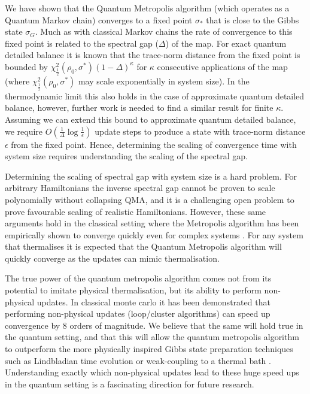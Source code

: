 \documentclass[aps,floatfix,10pt,amssymb,amsfont,amsmath,superscriptaddress,float,nofootinbib,longbibliography,nobalancelastpage,twocolumn]{revtex4-2}
\begin{document}
We have shown that the Quantum Metropolis algorithm (which operates as a Quantum Markov chain) converges to a fixed point $\sigma_*$ that is close to the Gibbs state $\sigma_G$. Much as with classical Markov chains the rate of convergence to this fixed point is related to the spectral gap ($\Delta$) of the map. For exact quantum detailed balance it is known \cite{temme2010chi} that the trace-norm distance from the fixed point is bounded by $\chi^2_{\frac{1}{2}}(\rho_0,\sigma^*) (1-\Delta)^\kappa$ for $\kappa$ consecutive applications of the map (where $\chi^2_{\frac{1}{2}}(\rho_0,\sigma^*)$ may scale exponentially in system size). In the thermodynamic limit this also holds in the case of approximate quantum detailed balance, however, further work is needed to find a similar result for finite $\kappa$. Assuming we can extend this bound to approximate quantum detailed balance, we require $O(\frac{1}{\Delta}\log \frac{1}{\epsilon})$ update steps to produce a state with trace-norm distance $\epsilon$ from the fixed point. Hence, determining the scaling of convergence time with system size requires understanding the scaling of the spectral gap.

Determining the scaling of spectral gap with system size is a hard problem. For arbitrary Hamiltonians the inverse spectral gap cannot be proven to scale polynomially without collapsing QMA, and it is a challenging open problem to prove favourable scaling of realistic Hamiltonians. However, these same arguments hold in the classical setting where the Metropolis algorithm has been empirically shown to converge quickly even for complex systems \cite{}.  For any system that thermalises it is expected that the Quantum Metropolis algorithm will quickly converge as the updates can mimic thermalisation.

The true power of the quantum metropolis algorithm comes not from its potential to imitate physical thermalisation, but its ability to perform non-physical updates. In classical monte carlo it has been demonstrated \cite{todo2019parallel} that performing non-physical updates (loop/cluster algorithms) can speed up convergence by 8 orders of magnitude. We believe that the same will hold true in the quantum setting, and that this will allow the quantum metropolis algorithm to outperform the more physically inspired Gibbs state preparation techniques such as Lindbladian time evolution \cite{chen2023quantumthermalstatepreparation,rall2023thermal} or weak-coupling to a thermal bath \cite{chen2021fast,shtanko2021preparing}. Understanding exactly which non-physical updates lead to these huge speed ups in the quantum setting is a fascinating direction for future research.
\end{document}
